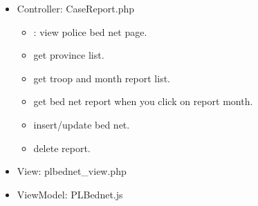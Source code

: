 \documentclass[letterpaper,10pt,english,openany,oneside]{sphinxmanual}
\begin{document}
\begin{itemize}
\item {} 
\sphinxAtStartPar
Controller: CaseReport.php
\begin{itemize}
\item {} 
\sphinxAtStartPar
{} : view police bed net page.

\item {} 
\sphinxAtStartPar
{} get province list.

\item {} 
\sphinxAtStartPar
{} get troop and month report list.

\item {} 
\sphinxAtStartPar
{} get bed net report when you click on report month.

\item {} 
\sphinxAtStartPar
{} insert/update bed net.

\end{itemize}

\begin{sphinxVerbatim}[commandchars=\\\{\}]
     
   
 
\end{sphinxVerbatim}
\begin{itemize}
\item {} 
\sphinxAtStartPar
{} delete report.

\end{itemize}

\item {} 
\sphinxAtStartPar
View: plbednet\_view.php

\item {} 
\sphinxAtStartPar
ViewModel: PLBednet.js

\end{itemize}

\begin{sphinxVerbatim}[commandchars=\\\{\}]
  
  
    
    
  
  
     
     
\end{sphinxVerbatim}
\end{document}
